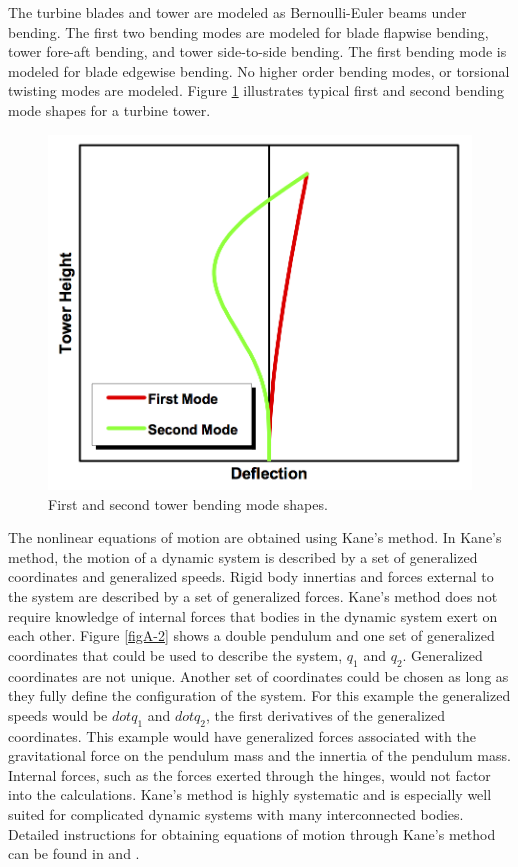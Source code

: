 The turbine blades and tower are modeled as Bernoulli-Euler beams under bending. The first two bending modes are modeled for blade flapwise bending, tower fore-aft bending, and tower side-to-side bending. The first bending mode is modeled for blade edgewise bending. No higher order bending modes, or torsional twisting modes are modeled. Figure \ref{figA-4} illustrates typical first and second bending mode shapes for a turbine tower.

\begin{figure}[ht]
	\centering
		\includegraphics[width=.5\linewidth]{Figures/AppendixAFigures/figA-4.png}
	\caption{First and second tower bending mode shapes.\cite{jonkman2005}}
	\label{figA-4}
\end{figure}

The nonlinear equations of motion are obtained using Kane's method. In Kane's method, the motion of a dynamic system is described by a set of generalized coordinates and generalized speeds. Rigid body innertias and forces external to the system are described by a set of generalized forces. Kane's method does not require knowledge of internal forces that bodies in the dynamic system exert on each other. Figure \ref{figA-2} shows a double pendulum and one set of generalized coordinates that could be used to describe the system, $q_1$ and $q_2$. Generalized coordinates are not unique. Another set of coordinates could be chosen as long as they fully define the configuration of the system. For this example the generalized speeds would be $dot{q}_1$ and $dot{q}_2$, the first derivatives of the generalized coordinates. This example would have generalized forces associated with the gravitational force on the pendulum mass and the innertia of the pendulum mass. Internal forces, such as the forces exerted through the hinges, would not factor into the calculations. Kane's method is highly systematic and is especially well suited for complicated dynamic systems with many interconnected bodies. Detailed instructions for obtaining equations of motion through Kane's method can be found in \cite{kane1985} and \cite{roithmayr2016}.

